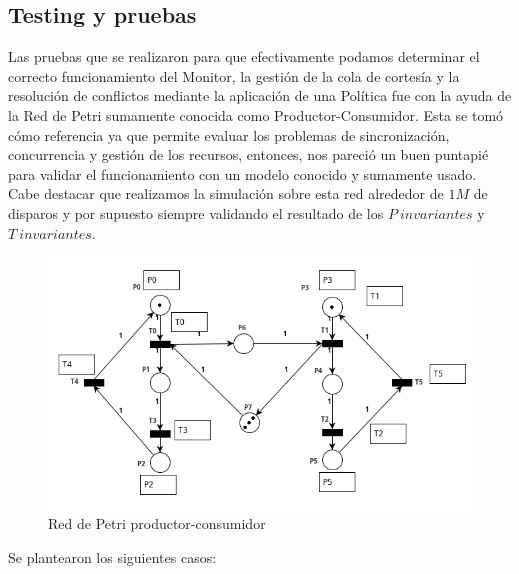 \subsection{Testing y pruebas}

Las pruebas que se realizaron para que efectivamente podamos determinar el correcto funcionamiento del Monitor, la gestión de la cola de cortesía y la resolución de conflictos mediante la aplicación de una Política fue con la ayuda de la Red de Petri sumamente conocida como Productor-Consumidor. Esta se tomó cómo referencia ya que permite evaluar los problemas de sincronización, concurrencia y gestión de los recursos, entonces, nos pareció un buen puntapié para validar el funcionamiento con un modelo conocido y sumamente usado. Cabe destacar que realizamos la simulación sobre esta red alrededor de $1M$ de disparos y por supuesto siempre validando el resultado de los $P\ invariantes$ y $T\ invariantes$.

\begin{figure}[H]
   \centering
   \includegraphics[width=0.9\linewidth]{images/rdp_prod_cons.png}
   \caption{Red de Petri productor-consumidor}
   \label{fig:rdp_prod_cons}
\end{figure}

Se plantearon los siguientes casos:

